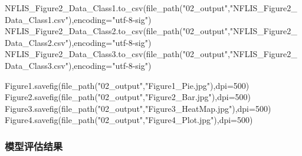 \documentclass[
]{article}
\newenvironment{Shaded}{}{}
\newcommand{\DecValTok}[1]{\textcolor[rgb]{0.25,0.63,0.44}{#1}}
\newcommand{\NormalTok}[1]{#1}
\newcommand{\OperatorTok}[1]{\textcolor[rgb]{0.40,0.40,0.40}{#1}}
\newcommand{\StringTok}[1]{\textcolor[rgb]{0.25,0.44,0.63}{#1}}
\begin{document}
\begin{Shaded}
\begin{Highlighting}[]
\NormalTok{NFLIS\_Figure2\_Data\_Class1.to\_csv(file\_path(}\StringTok{"02\_output"}\NormalTok{,}\StringTok{"NFLIS\_Figure2\_Data\_Class1.csv"}\NormalTok{),encoding}\OperatorTok{=}\StringTok{"utf{-}8{-}sig"}\NormalTok{)}
\NormalTok{NFLIS\_Figure2\_Data\_Class2.to\_csv(file\_path(}\StringTok{"02\_output"}\NormalTok{,}\StringTok{"NFLIS\_Figure2\_Data\_Class2.csv"}\NormalTok{),encoding}\OperatorTok{=}\StringTok{"utf{-}8{-}sig"}\NormalTok{)}
\NormalTok{NFLIS\_Figure2\_Data\_Class3.to\_csv(file\_path(}\StringTok{"02\_output"}\NormalTok{,}\StringTok{"NFLIS\_Figure2\_Data\_Class3.csv"}\NormalTok{),encoding}\OperatorTok{=}\StringTok{"utf{-}8{-}sig"}\NormalTok{)}
\end{Highlighting}
\end{Shaded}

\begin{Shaded}
\begin{Highlighting}[]
\NormalTok{Figure1.savefig(file\_path(}\StringTok{"02\_output"}\NormalTok{,}\StringTok{"Figure1\_Pie.jpg"}\NormalTok{),dpi}\OperatorTok{=}\DecValTok{500}\NormalTok{)}
\NormalTok{Figure2.savefig(file\_path(}\StringTok{"02\_output"}\NormalTok{,}\StringTok{"Figure2\_Bar.jpg"}\NormalTok{),dpi}\OperatorTok{=}\DecValTok{500}\NormalTok{)}
\NormalTok{Figure3.savefig(file\_path(}\StringTok{"02\_output"}\NormalTok{,}\StringTok{"Figure3\_HeatMap.jpg"}\NormalTok{),dpi}\OperatorTok{=}\DecValTok{500}\NormalTok{)}
\NormalTok{Figure4.savefig(file\_path(}\StringTok{"02\_output"}\NormalTok{,}\StringTok{"Figure4\_Plot.jpg"}\NormalTok{),dpi}\OperatorTok{=}\DecValTok{500}\NormalTok{)}
\end{Highlighting}
\end{Shaded}

\hypertarget{header-n354}{%
\subsubsection{模型评估结果}\label{header-n354}}
\end{document}
